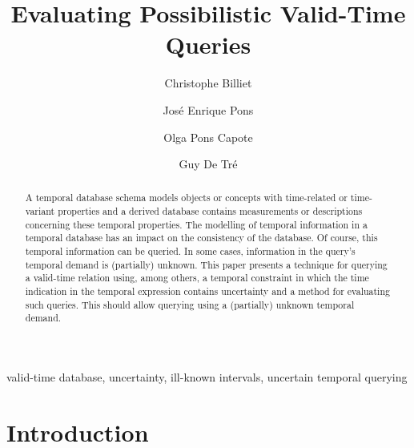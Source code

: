 \documentclass{llncs}
\newenvironment{keywords}{
       \list{}{\advance\topsep by0.35cm\relax\small
       \leftmargin=1cm
       \labelwidth=0.35cm
       \listparindent=0.35cm
       \itemindent\listparindent
       \rightmargin\leftmargin}\item[\hskip\labelsep
                                     \bfseries Keywords:]}
{\endlist}
\begin{document}
\mainmatter              %
%
\title{Evaluating Possibilistic Valid-Time Queries}
%
\author{Christophe Billiet \and Jos\'e Enrique Pons \and Olga Pons Capote \and Guy De Tr\'e}


%
%

\maketitle              %

\begin{abstract}
A temporal database schema models objects or concepts with time-related or time-variant properties and a derived database contains measurements or descriptions concerning these temporal properties. The modelling of temporal information in a temporal database has an impact on the consistency of the database. Of course, this temporal information can be queried. In some cases, information in the query's temporal demand is (partially) unknown. This paper presents a technique for querying a valid-time relation using, among others, a temporal constraint in which the time indication in the temporal expression contains uncertainty and a method for evaluating such queries. This should allow querying using a (partially) unknown temporal demand.
\end{abstract}

\begin{keywords}
valid-time database, uncertainty, ill-known intervals, uncertain temporal querying
\end{keywords}

\section{Introduction}
\label{sec:Introduction}

%
\vspace{-10pt}
\end{document}
